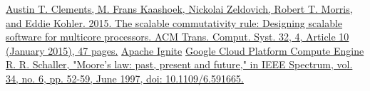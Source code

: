 \documentclass[conference]{IEEEtran}
\begin{document}
\begin{thebibliography}{00}
 \href{https://dl.acm.org/doi/10.1145/2699681}{Austin T. Clements, M. Frans Kaashoek, Nickolai Zeldovich, Robert T. Morris, and Eddie Kohler. 2015. The scalable commutativity rule: Designing scalable software for multicore processors. ACM Trans. Comput. Syst. 32, 4, Article 10 (January 2015), 47 pages.}
 \href{https://ignite.apache.org/docs/latest/}{Apache Ignite}
 \href{https://cloud.google.com/compute/docs}{Google Cloud Platform Compute Engine}
 \href{https://ieeexplore.ieee.org/document/591665}{R. R. Schaller, "Moore's law: past, present and future," in IEEE Spectrum, vol. 34, no. 6, pp. 52-59, June 1997, doi: 10.1109/6.591665.}

\end{thebibliography}

\vspace{12pt}
\end{document}
